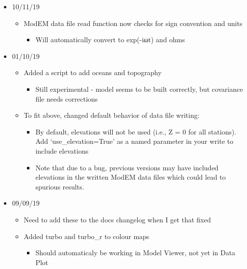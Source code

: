 \documentclass[letterpaper,10pt,english]{sphinxmanual}
\begin{document}
\begin{itemize}
\begin{itemize}
\begin{itemize}
\end{itemize}

\end{itemize}

\item {} 
10/11/19
\begin{itemize}
\item {} 
ModEM data file read function now checks for sign convention and units
\begin{itemize}
\item {} 
Will automatically convert to exp(-iωt) and ohms

\end{itemize}

\end{itemize}

\item {} 
01/10/19
\begin{itemize}
\item {} 
Added a script to add oceans and topography
\begin{itemize}
\item {} 
Still experimental - model seems to be built correctly, but covariance file needs corrections

\end{itemize}

\item {} 
To fit above, changed default behavior of data file writing:
\begin{itemize}
\item {} 
By default, elevations will not be used (i.e., Z = 0 for all stations). Add ‘use\_elevation=True’ as a named parameter in your write to include elevations

\item {} 
Note that due to a bug, previous versions may have included elevations in the written ModEM data files which could lead to spurious results.

\end{itemize}

\end{itemize}

\item {} 
09/09/19
\begin{itemize}
\item {} 
Need to add these to the docs changelog when I get that fixed

\item {} 
Added turbo and turbo\_r to colour maps
\begin{itemize}
\item {} 
Should automaticaly be working in Model Viewer, not yet in Data Plot


\end{itemize}
\end{itemize}
\end{itemize}
\end{document}
